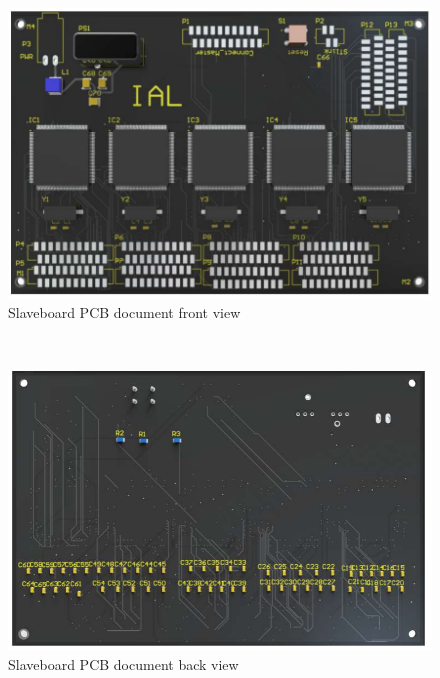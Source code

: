 \begin{figure}[!ht]
	\centering
	\includegraphics[width=16cm]{grafiken/6.16.pdf}
	\caption{Slaveboard PCB document front view} 
	\label{fig:6.16}
\end{figure}
\FloatBarrier
\\


\begin{figure}[!ht]
	\centering
	\includegraphics[width=16cm]{grafiken/6.17.pdf}
	\caption{Slaveboard PCB document back view} 
	\label{fig:6.17}
\end{figure}
\FloatBarrier
\\



